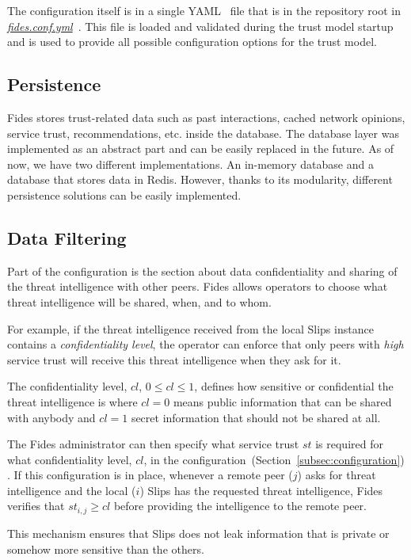 The configuration itself is in a single YAML~\cite{yaml} file that is in the repository root in \href{https://github.com/LukasForst/fides/blob/master/fides.conf.yml}{\textit{fides.conf.yml}}~\cite{fidesGithub}.
This file is loaded and validated during the trust model startup and is used to provide all possible configuration options for the trust model.

\subsection{Persistence}
\label{subsec:persistence}
Fides stores trust-related data such as past interactions, cached network opinions, service trust, recommendations, etc. inside the database.
The database layer was implemented as an abstract part and can be easily replaced in the future.
As of now, we have two different implementations. An in-memory database and a database that stores data in Redis.
However, thanks to its modularity, different persistence solutions can be easily implemented.

\subsection{Data Filtering}
\label{subsec:data-filtering}
Part of the configuration is the section about data confidentiality and sharing of the threat intelligence with other peers.
Fides allows operators to choose what threat intelligence will be shared, when, and to whom.

For example, if the threat intelligence received from the local Slips instance contains a \textit{confidentiality level}, the operator can enforce that only peers with \textit{high} service trust will receive this threat intelligence when they ask for it.

The confidentiality level, $cl$, $0 \leq cl \leq 1$, defines how sensitive or confidential the threat intelligence is where $cl = 0$ means public information that can be shared with anybody and $cl = 1$ secret information that should not be shared at all.

The Fides administrator can then specify what service trust $st$ is required for what confidentiality level, $cl$, in the configuration~(Section~\ref{subsec:configuration}) .
If this configuration is in place, whenever a remote peer ($j$) asks for threat intelligence and the local ($i$) Slips has the requested threat intelligence, Fides verifies that $st_{i, j} \geq cl$ before providing the intelligence to the remote peer.

This mechanism ensures that Slips does not leak information that is private or somehow more sensitive than the others.